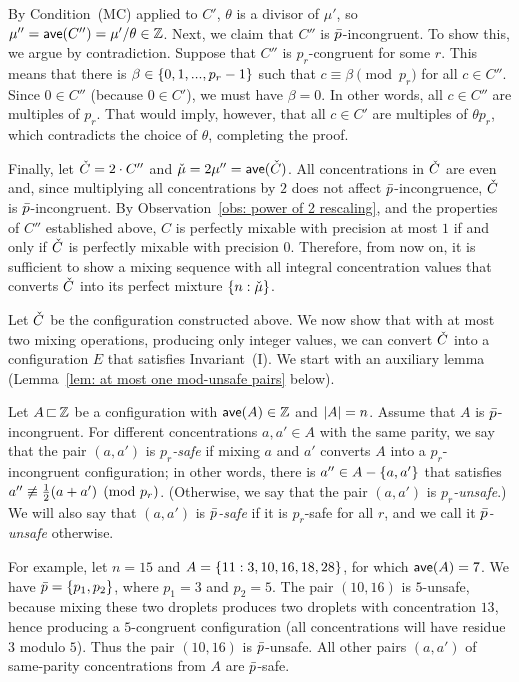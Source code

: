 By Condition~(MC) applied to $C'$,
$\theta$ is a divisor of $\mu'$, so $\mu'' = {\textsf{ave}}(C'') = \mu'/\theta\in {\mathbb Z}$.
Next, we claim that $C''$ is ${\bar{p}}$-incongruent. To show this, we argue
by contradiction. Suppose that $C''$ is $p_r$-congruent for some $r$.
This means that there is $\beta\in{ \left\{ 0,1,...,p_r-1 \right\} }$ such that
$c\equiv \beta \pmod{p_r}$ for all $c\in C''$. Since $0\in C''$ (because $0\in C'$),
we must have $\beta = 0$. In other words, all $c\in C''$ are multiples of $p_r$.
That would imply, however, that all $c\in C'$ are multiples of $\theta p_r$,
which contradicts the choice of $\theta$, completing the proof.

Finally, let ${\check{C}} = 2\cdot C''$ and ${\check{\mu}} = 2\mu''= {\textsf{ave}}({\check{C}})$. 
All concentrations in ${\check{C}}$ are even and, since multiplying all concentrations by $2$
does not affect ${\bar{p}}$-incongruence, ${\check{C}}$ is ${\bar{p}}$-incongruent. 
By Observation~\ref{obs: power of 2 rescaling}, and the properties of $C''$ established above,
$C$ is perfectly mixable with precision at most $1$ if and only if
${\check{C}}$ is perfectly mixable with precision $0$. Therefore, from now
on, it is sufficient to show a mixing sequence with all integral concentration values that converts
${\check{C}}$ into its perfect mixture ${ \left\{ n:{\check{\mu}} \right\} }$.




Let ${\check{C}}$ be the configuration constructed above. We now show that
with at most two mixing operations, producing only integer values, we can
convert ${\check{C}}$ into a configuration $E$ that satisfies Invariant~(I).
We start with an auxiliary lemma (Lemma~\ref{lem: at most one mod-unsafe pairs} below).

Let $A{\,\sqsubset\,}{\mathbb Z}$ be a configuration with ${\textsf{ave}}(A)\in{\mathbb Z}$ and ${|A|} = n$. 
Assume that $A$ is ${\bar{p}}$-incongruent.
For different concentrations $a, a' \in A$ with the same parity, we say that
the pair $(a,a')$ is \emph{$p_r$-safe} if mixing $a$ and $a'$ converts $A$
into a $p_r$-incongruent configuration; in other words, there is $a''\in A-{ \left\{ a,a' \right\} }$
that satisfies $a'' \not\equiv {\textstyle\frac{1}{2}}(a+a') \pmod{p_r}$. 
(Otherwise, we say that the pair $(a,a')$ is \emph{$p_r$-unsafe}.)
We will also say that $(a,a')$ is \emph{${\bar{p}}$-safe} if it is $p_r$-safe for all $r$,
and we call it \emph{${\bar{p}}$-unsafe} otherwise.

For example, let $n=15$ and $A = { \left\{ 11:3,10,16,18,28 \right\} }$, for which ${\textsf{ave}}(A) = 7$. 
We have ${\bar{p}} = { \left\{ p_1,p_2 \right\} }$, where $p_1 = 3$ and $p_2 = 5$. 
The pair $(10,16)$ is $5$-unsafe, because mixing these two droplets produces
two droplets with concentration $13$, hence producing a $5$-congruent configuration
(all concentrations will have residue $3$ modulo $5$).
Thus the pair $(10,16)$ is ${\bar{p}}$-unsafe.
All other pairs $(a,a')$ of same-parity concentrations from $A$
are ${\bar{p}}$-safe. 


